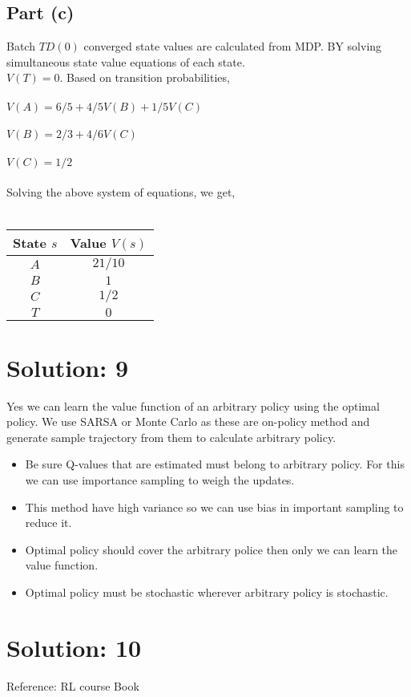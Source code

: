 \documentclass{article}
\begin{document}
\subsection{Part (c)}
Batch $TD(0)$ converged state values are calculated from MDP. BY solving simultaneous state value equations of each state.
\\
$V(T)=0.$ Based on transition probabilities,\\
\\
$V(A)=6/5 + 4/5V(B)+1/5V(C)$\\
\\
$V(B)=2/3+ 4/6V(C)$\\
\\
$V(C)=1/2$\\
\\
Solving the above system of equations, we get,\\
\\
\begin{tabular}{|c|c|}
\hline 
State $s$ & Value $V(s)$\tabularnewline
\hline 
\hline 
$A$ & $21/10$\tabularnewline
\hline 
$B$ & $1$\tabularnewline
\hline 
$C$ & $1/2$\tabularnewline
\hline 
$T$ & $0$\tabularnewline
\hline 
\end{tabular}


\section{Solution: 9}
Yes we can learn the value function of an arbitrary policy using the optimal policy.
We use SARSA or Monte Carlo as these are on-policy method and generate sample trajectory from them to calculate arbitrary policy.
\begin{itemize}
\item Be sure Q-values that are estimated must belong to arbitrary policy. For this we can use importance sampling to weigh the updates.
\item This method have high variance so we can use bias in important sampling to reduce it.
\item Optimal policy should cover the arbitrary police then only we can learn the value function.
\item Optimal policy must be stochastic wherever arbitrary policy is stochastic.
\end{itemize}

\section{Solution: 10} 
Reference: RL course Book\\\\
\end{document}
